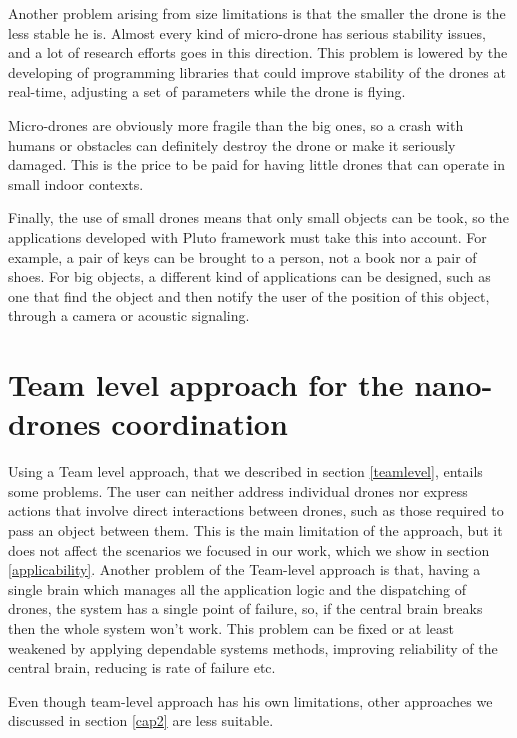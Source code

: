 Another problem arising from size limitations is that the smaller the drone is the less stable he is.
Almost every kind of micro-drone has serious stability issues, and a lot of research efforts goes in this direction. This problem is lowered by the developing of programming libraries that could improve stability of the drones at real-time, adjusting a set of parameters while the drone is flying.

Micro-drones are obviously more fragile than the big ones, so a crash with humans or obstacles can definitely destroy the drone or make it seriously damaged. This is the price to be paid for having little drones that can operate in small indoor contexts.

Finally, the use of small drones means that only small objects can be took, so the applications developed with Pluto framework must take this into account.
For example, a pair of keys can be brought to a person, not a book nor a pair of shoes. For big objects, a different kind of applications can be designed, such as one that find the object and then notify the user of the position of this object, through a camera or acoustic signaling.




\newpage


\section{Team level approach for the nano-drones coordination}\label{teamlevelproblems}


Using a Team level approach, that we described in section \ref{teamlevel}, entails some problems. 
The user can neither address individual drones nor express actions that involve direct interactions between drones, such as those required to pass an object between them.
This is the main limitation of the approach, but it does not affect the scenarios we focused in our work, which we show in section \ref{applicability}.
Another problem of the Team-level approach is that, having a single brain which manages all the application logic and the dispatching of drones, the system has a single point of failure, so, if the central brain breaks then the whole system won't work.
This problem can be fixed or at least weakened by applying dependable systems methods, improving reliability of the central brain, reducing is rate of failure etc.

Even though team-level approach has his own limitations, other approaches we discussed in section \ref{cap2} are less suitable.

